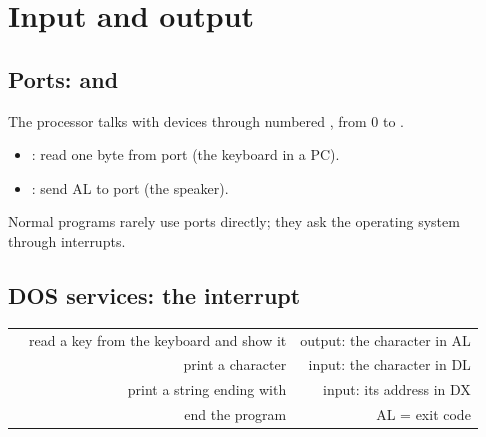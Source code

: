 \section{Input and output}

\subsection{Ports:  and }
The processor talks with devices through numbered , from 0 to .
\begin{itemize}
    \item {}: read one byte from port  (the keyboard in a PC).
    \item {}: send AL to port  (the speaker).
\end{itemize}
Normal programs rarely use ports directly; they ask the operating system through interrupts.

\subsection{DOS services: the  interrupt}
\begin{center}
\small
\begin{tabularx}{\linewidth}{|c|R|R|}
    \hline
     &  &  \\ \hline
     & read a key from the keyboard and show it & output: the character in AL \\ \hline
     & print a character & input: the character in DL \\ \hline
     & print a string ending with \code{\$} & input: its address in DX \\ \hline
     & end the program & AL = exit code \\ \hline
\end{tabularx}
\end{center}


\begin{sharh}
\end{sharh}


